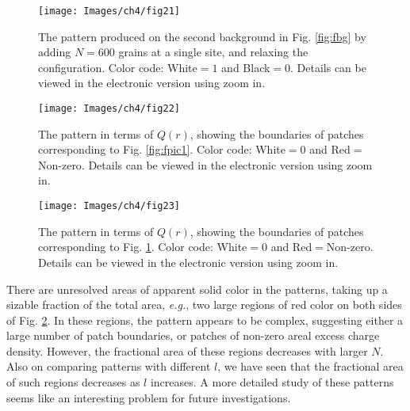 \documentclass[11pt,a4paper]{book}
\begin{document}
%
\begin{figure}
\begin{center}
\texttt{[image: Images/ch4/fig21]}
\caption{The pattern produced on the second background in
Fig. \ref{fig:fbg} by adding $N=600$ grains at a single site, and
relaxing the configuration. Color code: White$=1$ and Black$=0$.
Details can be viewed in the electronic
version using zoom in.}
\label{fig:fpic2}
\end{center}
\end{figure}
%
\begin{figure}
\texttt{[image: Images/ch4/fig22]}
\caption{The pattern in terms of $Q(r)$, showing the boundaries of 
patches
corresponding to Fig. \ref{fig:fpic1}. Color code: White$=0$ and Red$=$Non-zero.
Details can be viewed in the electronic
version using zoom in.}
\label{fig:flinepic1}
\end{figure}
%
\begin{figure}
\begin{center}
\texttt{[image: Images/ch4/fig23]}
\caption{The pattern in terms of $Q(r)$, showing the boundaries of patches
corresponding to Fig. \ref{fig:fpic2}. Color code: White$=0$ and Red$=$Non-zero.
Details can be viewed in the electronic
version using zoom in.}
\label{fig:flinepic2}
\end{center}
\end{figure}
%

There are unresolved areas of apparent solid color in the patterns, taking up a
sizable fraction of the total area, \textit{e.g.},
two large regions of red color on both sides of Fig.
\ref{fig:flinepic1}. In these regions, the pattern appears to be complex,
suggesting either a large number of patch boundaries, or patches of non-zero areal excess charge
density. However, the fractional area of these
regions decreases with larger $N$. Also on comparing patterns
with different $l$, we have seen that the fractional area of such
regions decreases as $l$ increases. A more detailed study of these
patterns seems like an interesting problem for future investigations.
\end{document}
